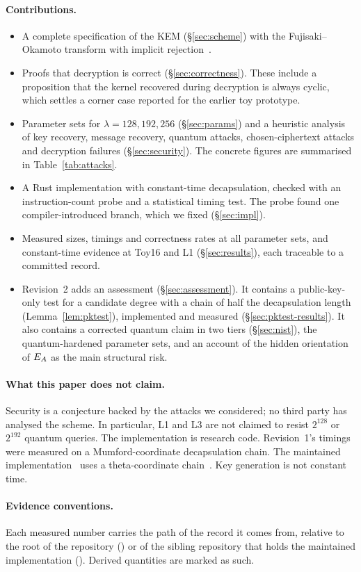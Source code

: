 \paragraph{Contributions.}
\begin{itemize}
\item A complete specification of the KEM (\S\ref{sec:scheme}) with the
  Fujisaki--Okamoto transform with implicit rejection~\cite{HHK17}.
\item Proofs that decryption is correct (\S\ref{sec:correctness}). These
  include a proposition that the kernel recovered during decryption is always
  cyclic, which settles a corner case reported for the earlier toy prototype.
\item Parameter sets for $\lambda=128,192,256$ (\S\ref{sec:params}) and a
  heuristic analysis of key recovery, message recovery, quantum attacks,
  chosen-ciphertext attacks and decryption failures (\S\ref{sec:security}).
  The concrete figures are summarised in Table~\ref{tab:attacks}.
\item A Rust implementation with constant-time decapsulation, checked with an
  instruction-count probe and a statistical timing test. The probe found one
  compiler-introduced branch, which we fixed (\S\ref{sec:impl}).
\item Measured sizes, timings and correctness rates at all parameter sets, and
  constant-time evidence at Toy16 and L1 (\S\ref{sec:results}), each
  traceable to a committed record.
\item Revision~2 adds an assessment (\S\ref{sec:assessment}). It contains a
  public-key-only test for a candidate degree with a chain of half the
  decapsulation length (Lemma~\ref{lem:pktest}), implemented and measured
  (\S\ref{sec:pktest-results}). It also contains a corrected
  quantum claim in two tiers (\S\ref{sec:nist}), the quantum-hardened
  parameter sets, and an account of the hidden orientation of $E_A$ as
  the main structural risk.
\end{itemize}

\paragraph{What this paper does not claim.} Security is a conjecture backed by
the attacks we considered; no third party has analysed the scheme. In
particular, L1 and L3 are not claimed to resist $2^{128}$ or $2^{192}$
quantum queries. The implementation is research code. Revision~1's timings
were measured on a Mumford-coordinate decapsulation chain. The maintained
implementation~\cite{EigenX} uses a theta-coordinate chain~\cite{DMPR23}.
Key generation is not constant time.

\paragraph{Evidence conventions.} Each measured number carries the path of the
record it comes from, relative to the root of the repository
() or of the sibling repository that holds the maintained
implementation (). Derived quantities are marked as such.
